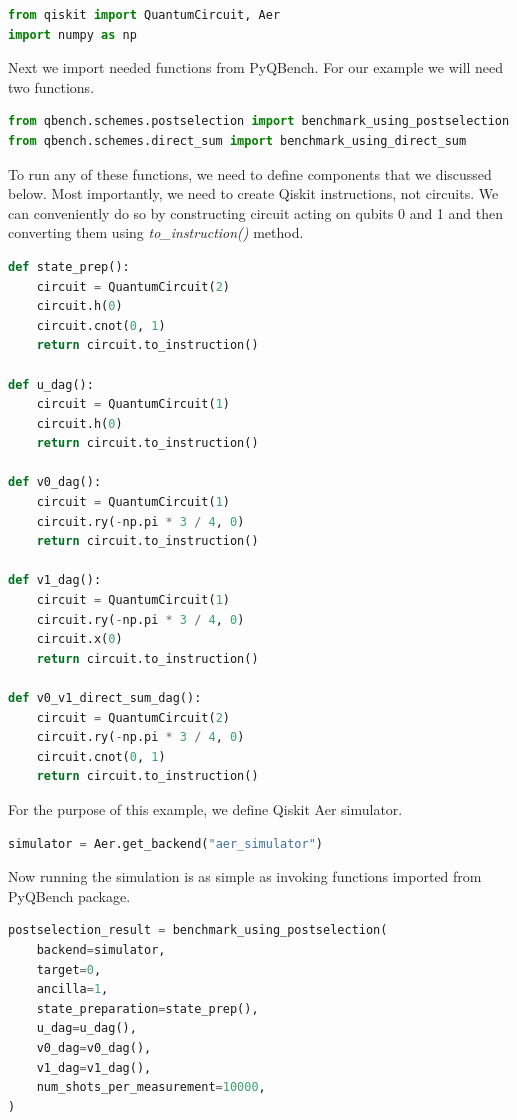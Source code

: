 \documentclass[preprint,12pt, a4paper, dvipsnames]{elsarticle}
\newcommand{\1}{{\rm 1\hspace{-0.9mm}l}}
\begin{document}
\begin{lstlisting}[language=Python]
from qiskit import QuantumCircuit, Aer
import numpy as np
\end{lstlisting}
Next we import needed functions from PyQBench. For our example we will need two functions. 
\begin{lstlisting}[language=Python]
from qbench.schemes.postselection import benchmark_using_postselection
from qbench.schemes.direct_sum import benchmark_using_direct_sum
\end{lstlisting}
To run any of these functions, we need to define components that we discussed below. Most importantly, we need to create Qiskit instructions, not circuits. We can conveniently do so by constructing circuit acting on qubits 0 and 1 and then converting them using \textit{to\_instruction()} method.
\begin{lstlisting}[language=Python, caption= Defining components for Hadamard experiment]
def state_prep():
	circuit = QuantumCircuit(2)
	circuit.h(0)
	circuit.cnot(0, 1)
	return circuit.to_instruction()

def u_dag():
	circuit = QuantumCircuit(1)
	circuit.h(0)
	return circuit.to_instruction()

def v0_dag():
	circuit = QuantumCircuit(1)
	circuit.ry(-np.pi * 3 / 4, 0)
	return circuit.to_instruction()

def v1_dag():
	circuit = QuantumCircuit(1)
	circuit.ry(-np.pi * 3 / 4, 0)
	circuit.x(0)
	return circuit.to_instruction()

def v0_v1_direct_sum_dag():
	circuit = QuantumCircuit(2)
	circuit.ry(-np.pi * 3 / 4, 0)
	circuit.cnot(0, 1)
	return circuit.to_instruction()

\end{lstlisting}
For the purpose of this example,  we define Qiskit Aer simulator.
\begin{lstlisting}[language=Python, caption= Defining a backend]
simulator = Aer.get_backend("aer_simulator")

\end{lstlisting}
Now running the simulation is as simple as invoking functions imported from PyQBench package.
\begin{lstlisting}[language=Python, caption=Simulation benchmark by using postselection]
postselection_result = benchmark_using_postselection(
	backend=simulator,
	target=0,
	ancilla=1,
	state_preparation=state_prep(),
	u_dag=u_dag(),
	v0_dag=v0_dag(),
	v1_dag=v1_dag(),
	num_shots_per_measurement=10000,
)
\end{lstlisting}
\end{document}
